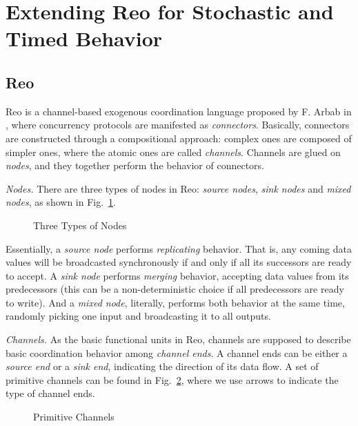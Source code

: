\section{Extending Reo for Stochastic and Timed Behavior}
\label{sec:reo}

\subsection{Reo}

Reo is a channel-based exogenous coordination language proposed by F. Arbab in \cite{ARBAB2004}, where concurrency protocols are manifested as \emph{connectors}. Basically, connectors are constructed through a compositional approach: complex ones are composed of simpler ones, where the atomic ones are called \emph{channels}. Channels are glued on \emph{nodes}, and they together perform the behavior of connectors.

\vspace{.5em}

\noindent\emph{Nodes.} There are three types of nodes in Reo: \emph{source nodes}, \emph{sink nodes} and \emph{mixed nodes}, as shown in Fig.~\ref{fig:typeofnodes}.

\begin{figure}[H]
    \centering
    
    \caption{Three Types of Nodes}
    \label{fig:typeofnodes}
\end{figure}

Essentially, a \emph{source node} performs \emph{replicating} behavior. That is, any coming data values will be broadcasted synchronously if and only if all its successors are ready to accept. A \emph{sink node} performs \emph{merging} behavior, accepting data values from its predecessors  (this can be a non-deterministic choice if all predecessors are ready to write). And a \emph{mixed node}, literally, performs both behavior at the same time, randomly picking one input and broadcasting it to all outputs.

\vspace{.5em}
\noindent\emph{Channels.} As the basic functional units in Reo, channels are supposed to describe basic coordination behavior among \emph{channel ends}. A channel ends can be either a \emph{source end} or a \emph{sink end}, indicating the direction of its data flow. A set of primitive channels can be found in Fig.~\ref{fig:basicchannels}, where we use arrows to indicate the type of channel ends.

\begin{figure}[H]
    \centering
    
    \caption{Primitive Channels}
    \label{fig:basicchannels}
\end{figure}

